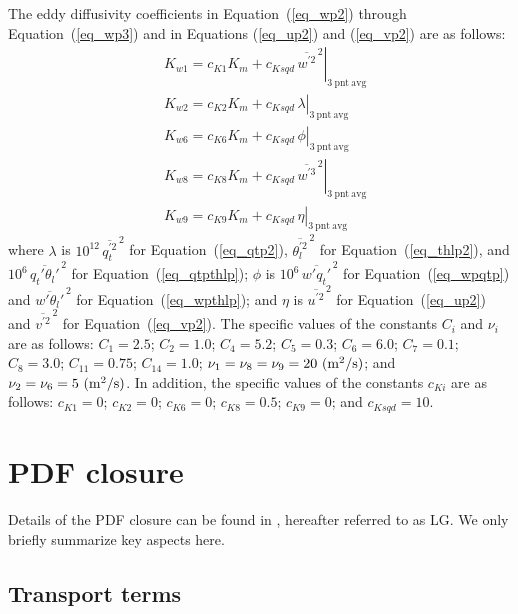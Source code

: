\documentclass[11pt,fleqn]{article}
\begin{document}
The eddy diffusivity coefficients in Equation~(\ref{eq_wp2}) through 
Equation~(\ref{eq_wp3}) and in Equations (\ref{eq_up2}) and (\ref{eq_vp2}) 
are as follows:
\begin{displaymath}
\begin{split}
& K_{w1} = c_{K1} K_m + \left. c_{Ksqd} \, \overline{w^{'2}}^{\, 2} 
                        \right|_{\mathrm{3 \ pnt \ avg}} \\
& K_{w2} = c_{K2} K_m + \left. c_{Ksqd} \, \lambda
                        \right|_{\mathrm{3 \ pnt \ avg}} \\
& K_{w6} = c_{K6} K_m + \left. c_{Ksqd} \, \phi
                        \right|_{\mathrm{3 \ pnt \ avg}} \\
& K_{w8} = c_{K8} K_m + \left. c_{Ksqd} \, \overline{w^{'3}}^{\, 2} 
                        \right|_{\mathrm{3 \ pnt \ avg}} \\
& K_{w9} = c_{K9} K_m + \left. c_{Ksqd} \, \eta
                        \right|_{\mathrm{3 \ pnt \ avg}}
\end{split}
\end{displaymath}
%
where $\lambda$ is $10^{12} \, \overline{q_t^{'2}}^{\, 2}$ for 
Equation~(\ref{eq_qtp2}), $\overline{\theta_l^{'2}}^{\, 2}$ for 
Equation~(\ref{eq_thlp2}), and $10^6 \, \overline{q_t'\theta_l'}^{\, 2}$ 
for Equation~(\ref{eq_qtpthlp});
$\phi$ is $10^6 \, \overline{w'q_t'}^{\, 2}$ for Equation~(\ref{eq_wpqtp})
and $\overline{w'\theta_l'}^{\, 2}$ for Equation~(\ref{eq_wpthlp}); and
$\eta$ is $\overline{u^{'2}}^{\, 2}$ for Equation~(\ref{eq_up2}) and 
$\overline{v^{'2}}^{\, 2}$ for Equation~(\ref{eq_vp2}).
%
The specific values of the constants $C_i$ and $\nu_i$
are as follows: $C_1 = 2.5$; $C_2 = 1.0$; $C_4 = 5.2$; $C_5 = 0.3$;
$C_6 = 6.0$; $C_7 = 0.1$; $C_8 = 3.0$; $C_{11} = 0.75$; $C_{14} = 1.0$;
$\nu_1 = \nu_8 = \nu_9 = 20 \hbox{ (m$^2$/s)}$;
and $\nu_2 = \nu_6 = 5 \hbox{ (m$^2$/s)}$.  In addition, the specific 
values of the constants $c_{Ki}$ are as follows:  $c_{K1} = 0$; 
$c_{K2} = 0$; $c_{K6} = 0$; $c_{K8} = 0.5$; $c_{K9} = 0$; and $c_{Ksqd} = 10$.

\section{PDF closure}

Details of the PDF closure can be found in \citet{larson2005a}, hereafter
referred to as LG. We only briefly summarize key aspects here.

\subsection{Transport terms}
\end{document}
